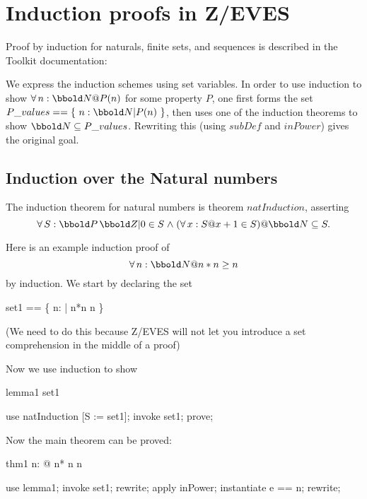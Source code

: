 \documentclass{article}
\begin{document}
\section{Induction proofs in Z/EVES}

Proof by induction for naturals, finite sets, and sequences is described in
the Toolkit documentation:
 
   We express the induction schemes using set variables.  In order to use
   induction to show $\forall n: \nat @ P(n)$ for some property $P$, one
   first forms the set $P\_values == \{~n: \nat | P(n)~\}$, then uses one
   of the induction theorems to show $\nat \subseteq P\_values$.  Rewriting
   this (using $subDef$ and $inPower$) gives the original goal.
   
\subsection{Induction over the Natural numbers}

The induction theorem for natural numbers is theorem $natInduction$,
asserting
$$     \forall S: \power \num
        |       0 \in S
          \land (\forall x: S @ x + 1 \in S)
        @ \nat \subseteq S. $$

Here is an example induction proof of
$$\forall n: \nat @ n * n \geq n$$
by induction.  We start by declaring the set

\begin{zed}
  set1 == \{ n: \nat | n*n \geq n \}
\end{zed}

(We need to do this because Z/EVES will not let you introduce a set
comprehension in the middle of a proof)

Now we use induction to show

\begin{theorem}{lemma1}
  \nat \subseteq set1
\end{theorem}

\begin{zproof}
use natInduction [S := set1];
invoke set1;
prove;
\end{zproof}

Now the main theorem can be proved:

\begin{theorem}{thm1}
 \forall n: \nat @ n* n \geq n
\end{theorem}

\begin{zproof}
use lemma1;
invoke set1;
rewrite;
apply inPower;
instantiate e == n;
rewrite;
\end{zproof}
\end{document}
